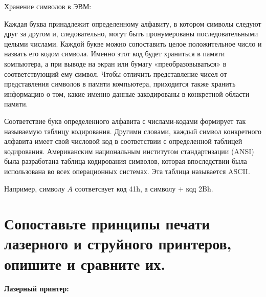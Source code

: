 \documentclass[unicode, 12pt, a4paper, oneside]{article}
\begin{document}
Хранение символов в ЭВМ:

Каждая буква принадлежит определенному алфавиту, в котором символы следуют друг за другом и, следовательно, могут быть пронумерованы последовательными целыми числами. Каждой букве можно сопоставить целое положительное число и назвать его кодом символа. Именно этот код будет храниться в памяти компьютера, а при выводе на экран или бумагу «преобразовываться» в соответствующий ему символ. Чтобы отличить представление чисел от представления символов в памяти компьютера, приходится также хранить информацию о том, какие именно данные закодированы в конкретной области памяти.

Соответствие букв определенного алфавита с числами-кодами формирует так называемую таблицу кодирования. Другими словами, каждый символ конкретного алфавита имеет свой числовой код в соответствии с определенной таблицей кодирования. Американским национальным институтом стандартизации (ANSI) была разработана таблица кодирования символов, которая впоследствии была использована во всех операционных системах. Эта таблица называется ASCII.

Например, символу $A$ соответсвует код 41h, а символу $+$ код 2Bh. 

\section{Сопоставьте принципы печати лазерного и струйного принтеров, опишите и сравните их.}

{\bf Лазерный принтер:}
\end{document}
